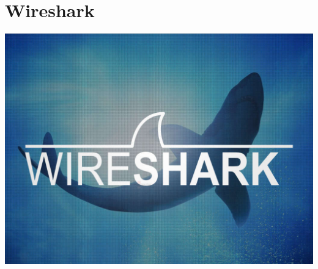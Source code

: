 \documentclass[xcolor=dvipsnames]{beamer}
\begin{document}
\section{Wireshark}
\begin{frame}
\centering
\includegraphics[scale=0.3]{wireshark_s}
\end{frame}
\end{document}
